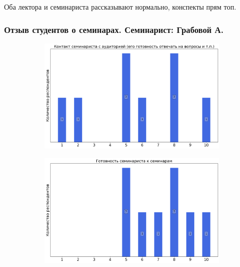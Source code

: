             \begin{commentbox} 
                Оба лектора и семинариста рассказывают нормально, конспекты прям топ. 
            \end{commentbox} 
    
    
    \subsubsection{Отзыв студентов о семинарах. Семинарист: Грабовой А.}
		\begin{figure}[H]
			\centering
			\begin{subfigure}[b]{0.45\textwidth}
				\centering
				\includegraphics[width=\textwidth]{images/4 course/Введение в машинное обучение/seminarists-marks-Грабовой А.-0.png}
			\end{subfigure}
			\begin{subfigure}[b]{0.45\textwidth}
				\centering
				\includegraphics[width=\textwidth]{images/4 course/Введение в машинное обучение/seminarists-marks-Грабовой А.-1.png}

\end{subfigure}
\end{figure}
